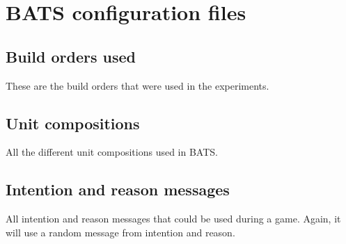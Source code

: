 \chapter{BATS configuration files}
\section{Build orders used}
\label{sec:build_orders_in_bats}
These are the build orders that were used in the experiments.




\section{Unit compositions}
\label{sec:unit_compositons_in_bats}
All the different unit compositions used in BATS.




\section{Intention and reason messages}
\label{sec:intention_and_reason_messages}
All intention and reason messages that could be used during a game. Again, it will use a random message from intention and reason.
